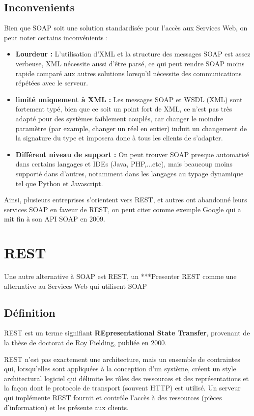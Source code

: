 \subsection{Inconvenients}
Bien que SOAP soit une solution standardisée pour l'accès aux Services Web, on peut noter certains inconvénients :
\begin{itemize}
	\item \textbf{Lourdeur :} L'utilisation d'XML et la structure des messages SOAP est assez verbeuse, XML nécessite aussi d'être parsé, ce qui peut rendre SOAP moins rapide comparé aux autres solutions lorsqu'il nécessite des communications répétées avec le serveur.
	\item \textbf{limité uniquement à XML :} Les messages SOAP et WSDL (XML) sont fortement typé, bien que ce soit un point fort de XML, ce n'est pas très adapté pour des systèmes faiblement couplés, car changer le moindre paramètre (par example, changer un réel en entier) induit un changement de la signature du type et imposera donc à tous les clients de s'adapter.
	\item \textbf{Différent niveau de support :} On peut trouver SOAP presque automatisé dans certains langages et IDEs (Java, PHP,...etc), mais beaucoup moins supporté dans d'autres, notamment dans les langages au typage dynamique tel que Python et Javascript.
\end{itemize}
				
Ainsi, plusieurs entreprises s'orientent vers REST, et autres ont abandonné leurs services SOAP en faveur de REST, on peut citer comme exemple Google qui a mit fin à son API SOAP en 2009.
\newpage

\section{REST}
Une autre alternative à SOAP est REST, un
***Presenter REST comme une alternative au Services Web qui utilisent SOAP
\subsection{Définition}
REST est un terme signifiant \textbf{REpresentational State Transfer}, provenant de la thèse de doctorat de Roy Fielding, publiée en 2000.
				
REST n'est pas exactement une architecture, mais un ensemble de contraintes qui, lorsqu'elles sont appliquées à la conception d'un système, créent un style architectural logiciel qui délimite les rôles des ressources et des représentations et la façon dont le protocole de transport (souvent HTTP) est utilisé. 
Un serveur qui implémente REST fournit et contrôle l'accès à des ressources (pièces d'information) et les présente aux clients.
			
